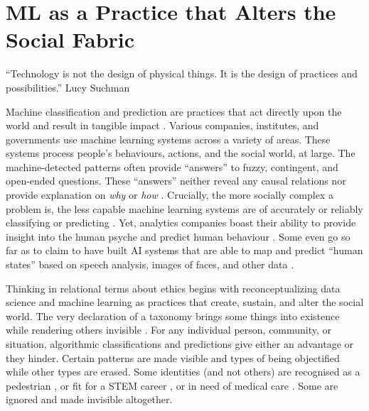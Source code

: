 


\section{ML as a Practice that Alters the Social Fabric}
\label{social fabric}
\begin{displayquote}
``Technology is not the design of physical things. It is the design of practices and possibilities.'' Lucy Suchman \cite{suchman2007human}
\end{displayquote}

Machine classification and prediction are practices that act directly upon the world and result in tangible impact \cite{mcquillan2018data}. Various companies, institutes, and governments use machine learning systems across a variety of areas. These systems process people's behaviours, actions, and the social world, at large. The machine-detected patterns often provide ``answers'' to fuzzy, contingent, and open-ended questions. These ``answers'' neither reveal any causal relations nor provide explanation on \textit{why} or \textit{how} \cite{pasquale2015black}. Crucially, the more socially complex a problem is, the less capable machine learning systems are of accurately or reliably classifying or predicting \cite{salganik2020measuring}. %
Yet, analytics companies boast their ability to provide insight into the human psyche and predict human behaviour \cite{Qualtrics}. Some even go so far as to claim to have built AI systems that are able to map and predict ``human states'' based on speech analysis, images of faces, and other data \cite{Affectiva}.

Thinking in relational terms about ethics begins with %
reconceptualizing data science and machine learning as practices that create, sustain, and alter the social world. %
The very declaration of a taxonomy brings some things into existence while rendering others invisible \cite{bowker2000sorting}. For any individual person, community, or situation, algorithmic classifications and predictions give either an advantage or they hinder. Certain patterns are made visible and types of being objectified while other types are erased. Some identities (and not others) are recognised as a pedestrian \cite{wilson2019predictive}, or fit for a STEM career \cite{lambrecht2019algorithmic}, or in need of medical care \cite{obermeyer2019dissecting}. Some are ignored and made invisible altogether. 

